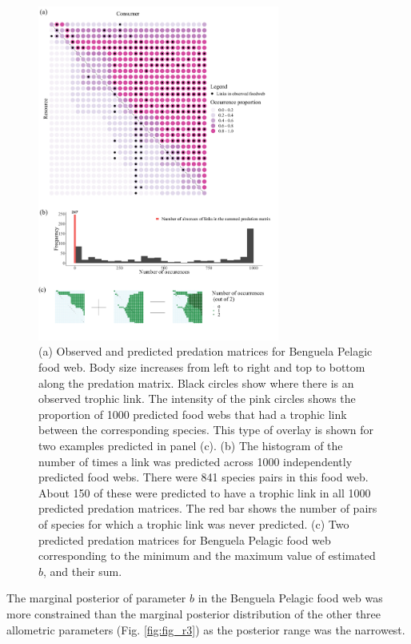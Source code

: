 \documentclass{article}
\providecommand{\DIFaddbeginFL}{} %
\providecommand{\DIFaddendFL}{} %
\providecommand{\DIFdelbeginFL}{} %
\providecommand{\DIFdelendFL}{} %
\newcommand{\DIFscaledelfig}{0.5}
\newlength{\DIFdelgraphicswidth} %
\newlength{\DIFdelgraphicsheight} %
\newcommand{\DIFaddincludegraphics}[2][]{{\color{blue}\fbox{\DIFOincludegraphics[#1]{#2}}}} %
\newcommand{\DIFdelincludegraphics}[2][]{%
\sbox{\DIFdelgraphicsbox}{\DIFOincludegraphics[#1]{#2}}%
\settoboxwidth{\DIFdelgraphicswidth}{\DIFdelgraphicsbox} %
\settoboxtotalheight{\DIFdelgraphicsheight}{\DIFdelgraphicsbox} %
\scalebox{\DIFscaledelfig}{%
\parbox[b]{\DIFdelgraphicswidth}{\usebox{\DIFdelgraphicsbox}\\[-\baselineskip] \rule{\DIFdelgraphicswidth}{0em}}\llap{\resizebox{\DIFdelgraphicswidth}{\DIFdelgraphicsheight}{%
\setlength{\unitlength}{\DIFdelgraphicswidth}%
\begin{picture}(1,1)%
\thicklines\linethickness{2pt} %
{\color[rgb]{1,0,0}\put(0,0){\framebox(1,1){}}}%
{\color[rgb]{1,0,0}\put(0,0){\line( 1,1){1}}}%
{\color[rgb]{1,0,0}\put(0,1){\line(1,-1){1}}}%
\end{picture}%
}\hspace*{3pt}}} %
} %
\DeclareRobustCommand{\DIFaddbeginFL}{\DIFOaddbeginFL \let\includegraphics\DIFaddincludegraphics} %
\DeclareRobustCommand{\DIFaddendFL}{\DIFOaddendFL \let\includegraphics\DIFOincludegraphics} %
\DeclareRobustCommand{\DIFdelbeginFL}{\DIFOdelbeginFL \let\includegraphics\DIFdelincludegraphics} %
\DeclareRobustCommand{\DIFdelendFL}{\DIFOaddendFL \let\includegraphics\DIFOincludegraphics} %
\begin{document}
\begin{figure}

{\centering \DIFdelbeginFL %
\DIFdelendFL \DIFaddbeginFL \includegraphics[width=300px]{fig/Benguela_Pelagic_pred_mat} 
\DIFaddendFL 

}

\caption{\label{fig:fig_r1} (a) Observed and predicted predation matrices for Benguela Pelagic food web. Body size increases from left to right and top to bottom along the predation matrix. Black circles show where there is an observed trophic link. The intensity of the pink circles shows the proportion of 1000 predicted food webs that had a trophic link between the corresponding species. This type of overlay is shown for two examples predicted in panel (c). (b) The histogram of the number of times a link was predicted across 1000 independently predicted food webs. There were 841 species pairs in this food web. About 150 of these were predicted to have a trophic link in all 1000 predicted predation matrices. The red bar shows the number of pairs of species for which a trophic link was never predicted. (c) Two predicted predation matrices for Benguela Pelagic food web corresponding to the minimum and the maximum value of estimated $b$, and their sum.}\label{fig:unnamed-chunk-5}
\end{figure}

The marginal posterior of parameter \(b\) in the Benguela Pelagic food
web was more constrained than the marginal posterior distribution of the
other three allometric parameters (Fig. \ref{fig:fig_r3}) as the
posterior range was the narrowest.
\end{document}

